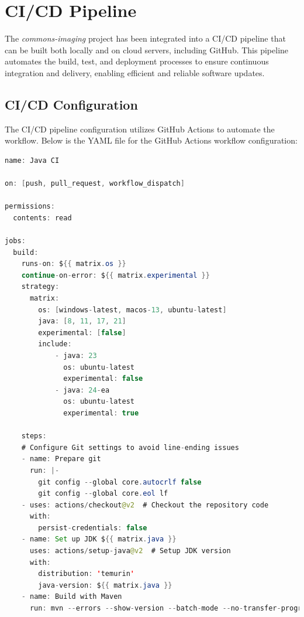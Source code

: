 \documentclass[a4paper,12pt]{report}
\begin{document}
\newpage

\chapter{CI/CD Pipeline}
The \textit{commons-imaging} project has been integrated into a CI/CD pipeline that can be built both locally and on cloud servers, including GitHub. This pipeline automates the build, test, and deployment processes to ensure continuous integration and delivery, enabling efficient and reliable software updates.

\section{CI/CD Configuration}
The CI/CD pipeline configuration utilizes GitHub Actions to automate the workflow. Below is the YAML file for the GitHub Actions workflow configuration:

\begin{lstlisting}[language=java, caption=GitHub Actions Workflow Configuration (\texttt{maven.yml})]
name: Java CI

on: [push, pull_request, workflow_dispatch]

permissions:
  contents: read

jobs:
  build:
    runs-on: ${{ matrix.os }}
    continue-on-error: ${{ matrix.experimental }}
    strategy:
      matrix:
        os: [windows-latest, macos-13, ubuntu-latest]
        java: [8, 11, 17, 21]
        experimental: [false]
        include:
            - java: 23
              os: ubuntu-latest
              experimental: false
            - java: 24-ea
              os: ubuntu-latest
              experimental: true

    steps:
    # Configure Git settings to avoid line-ending issues
    - name: Prepare git
      run: |-
        git config --global core.autocrlf false
        git config --global core.eol lf
    - uses: actions/checkout@v2  # Checkout the repository code
      with:
        persist-credentials: false
    - name: Set up JDK ${{ matrix.java }}
      uses: actions/setup-java@v2  # Setup JDK version
      with:
        distribution: 'temurin'
        java-version: ${{ matrix.java }}
    - name: Build with Maven
      run: mvn --errors --show-version --batch-mode --no-transfer-progress
\end{lstlisting}

\newpage


\end{document}
